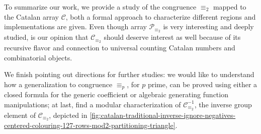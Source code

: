 To summarize our work, we provide a study of the congruence
$\equiv_{2}$ mapped to the Catalan array $\mathcal{C}$, both a formal
approach to characterize different regions and implementations are
given. Even though array $\mathcal{P}_{\equiv_{2}}$ is very
interesting and deeply studied, is our opinion that
$\mathcal{C}_{\equiv_{2}}$ should deserve interest as well because of
its recursive flavor and connection to universal counting Catalan
numbers and combinatorial objects.

We finish pointing out directions for further studies: we would like
to understand how a generalization to congruence $\equiv_{p}$, for $p$
prime, can be proved using either a closed formula for the generic
coefficient or algebraic generating function manipulations; at last,
find a modular characterization of $\mathcal{C}_{\equiv_{2}}^{-1}$,
the inverse group element of $\mathcal{C}_{\equiv_{2}}$, depicted in
\autoref{fig:catalan-traditional-inverse-ignore-negatives-centered-colouring-127-rows-mod2-partitioning-triangle}.


